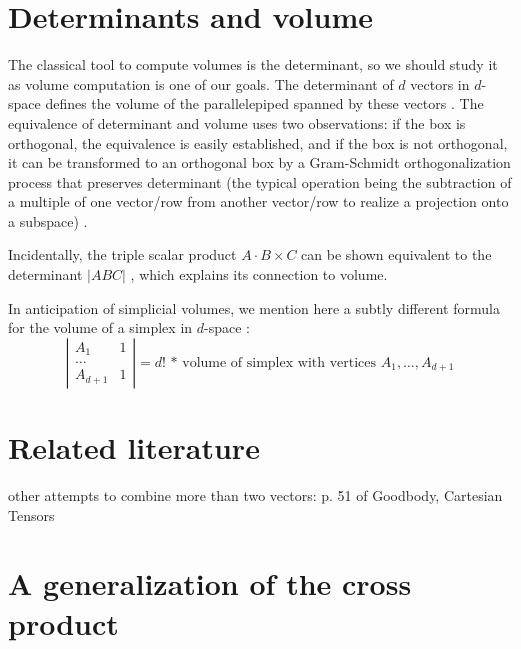 \documentclass[10pt]{article}
\begin{document}
\section{Determinants and volume}

The classical tool to compute volumes is the determinant,
so we should study it as volume computation is one of our goals.
The determinant of $d$ vectors in $d$-space defines the volume 
of the parallelepiped spanned by these vectors \cite{strang88}. %
The equivalence of determinant and volume uses two observations:
if the box is orthogonal, the equivalence is easily established, and 
if the box is not orthogonal, it can be transformed to an orthogonal box by a
Gram-Schmidt orthogonalization process that preserves determinant
(the typical operation being the subtraction of a multiple of one vector/row from
another vector/row to realize a projection onto a subspace) \cite{strang88}.

Incidentally, the triple scalar product $A \cdot B \times C$ 
can be shown equivalent to the determinant $|A B C|$ \cite[p. 104]{wrede72}, %
which explains its connection to volume.

In anticipation of simplicial volumes, we mention here a subtly different formula
for the volume of a simplex in $d$-space \cite[p. 27]{orourke94}:
\[
\left|
\begin{array}{cc}
A_1 & 1 \\
\ldots \\
A_{d+1} & 1 
\end{array}
\right|
    = d! \mbox{ * volume of simplex with vertices $A_1,\ldots,A_{d+1}$} 
\]

\section{Related literature}

other attempts to combine more than two vectors: p. 51 of Goodbody, Cartesian Tensors

\section{A generalization of the cross product}
\label{sec:gcp}
\end{document}
